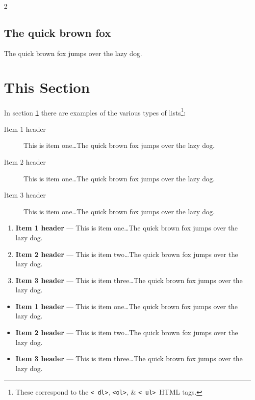 \documentclass[11pt]{article}%
\begin{document}
\begin{multicols*}{2}
\subsection{The quick brown fox}
\label{The quick brown fox}

The quick brown fox
jumps over the lazy
dog. \lipsum[2]

\section{This Section}
\label{This Section}

In section \ref{This Section} there are examples of the various
types of lists\footnote{These correspond to the {\tt \textless
dl\textgreater}, {\tt \textless ol\textgreater}, \& {\tt \textless
ul\textgreater}\ HTML tags.}:

\begin{description}
\item[Item 1 header] This is item one\dots The quick brown fox jumps
over the lazy dog.
\item[Item 2 header] This is item one\dots The quick brown fox jumps
over the lazy dog.
\item[Item 3 header] This is item one\dots The quick brown fox jumps
over the lazy dog.
\end{description}

\begin{enumerate}
\item {\bf Item 1 header} --- This is item one\dots The quick brown fox jumps
over the lazy dog.
\item {\bf Item 2 header} --- This is item two\dots The quick brown fox jumps
over the lazy dog.
\item {\bf Item 3 header} --- This is item three\dots The quick brown fox jumps
over the lazy dog.
\end{enumerate}

\begin{itemize}
\item {\bf Item 1 header} --- This is item one\dots The quick brown fox jumps
over the lazy dog.
\item {\bf Item 2 header} --- This is item two\dots The quick brown fox jumps
over the lazy dog.
\item {\bf Item 3 header} --- This is item three\dots The quick brown fox jumps
over the lazy dog.
\end{itemize}


\end{multicols*}
\end{document}
